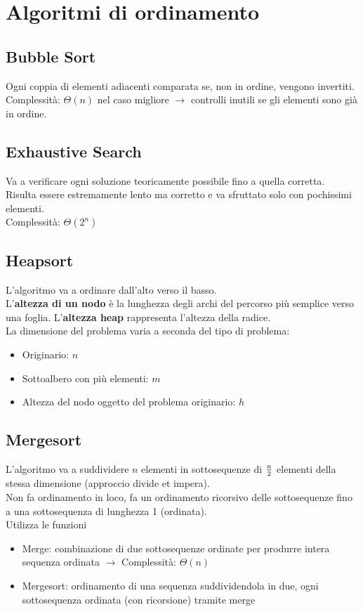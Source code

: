 \documentclass[12pt,a4paper]{article}
\begin{document}
\clearpage
\section{Algoritmi di ordinamento}
\subsection{Bubble Sort}
Ogni coppia di elementi adiacenti comparata se, non in ordine, vengono invertiti.\\
Complessità: $\Theta(n)$ nel caso migliore $\rightarrow$ controlli inutili se gli elementi sono già in ordine.

\subsection{Exhaustive Search}
Va a verificare ogni soluzione teoricamente possibile fino a quella corretta.\\
Risulta essere estremamente lento ma corretto e va sfruttato solo con pochissimi elementi.\\
Complessità: $\Theta(2^n)$

\subsection{Heapsort}
L'algoritmo va a ordinare dall'alto verso il basso.\\
L'\textbf{altezza di un nodo} è la lunghezza degli archi del percorso più semplice verso una foglia. L'\textbf{altezza heap} rappresenta l'altezza della radice.\\
La dimensione del problema varia a seconda del tipo di problema: \begin{itemize}
\item Originario: $n$
\item Sottoalbero con più elementi: $m$
\item Altezza del nodo oggetto del problema originario: $h$
\end{itemize}

\subsection{Mergesort}
L'algoritmo va a suddividere $n$ elementi in sottosequenze di ${n\over 2}$ elementi della stessa dimensione (approccio divide et impera).\\
Non fa ordinamento in loco, fa un ordinamento ricorsivo delle sottosequenze fino a una sottosequenza di lunghezza 1 (ordinata).\\
Utilizza le funzioni
\begin{itemize}
\item Merge: combinazione di due sottosequenze ordinate per produrre intera sequenza ordinata $\rightarrow$ Complessità: $\Theta(n)$
\item Mergesort: ordinamento di una sequenza suddividendola in due, ogni sottosequenza ordinata (con ricorsione) tramite merge
\end{itemize}
\end{document}
